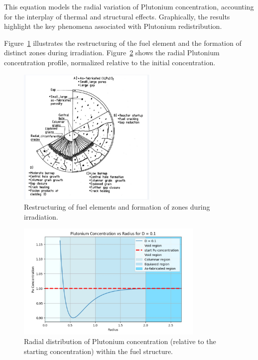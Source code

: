 This equation models the radial variation of Plutonium concentration, accounting for the interplay of thermal and structural effects. Graphically, the results highlight the key phenomena associated with Plutonium redistribution.

Figure~\ref{fig:Redistribution_Structure} illustrates the restructuring of the fuel element and the formation of distinct zones during irradiation. Figure~\ref{fig:Pu_Profile} shows the radial Plutonium concentration profile, normalized relative to the initial concentration.

\begin{figure}[H]
\centering
\includegraphics[width=0.6\textwidth]{Pu_redistributio_explaination.png}
\caption{Restructuring of fuel elements and formation of zones during irradiation.}
\label{fig:Redistribution_Structure}
\end{figure}

\begin{figure}[H]
\centering
\includegraphics[width=0.8\textwidth]{Pu_redistribution_profile.jpg}
\caption{Radial distribution of Plutonium concentration (relative to the starting concentration) within the fuel structure.}
\label{fig:Pu_Profile}
\end{figure}
